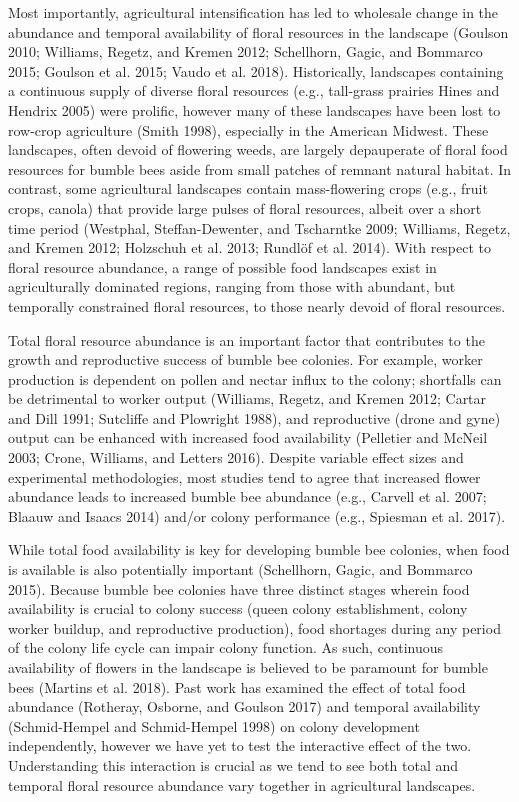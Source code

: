 \documentclass[11pt,]{article}
\begin{document}
Most importantly, agricultural intensification has led to wholesale
change in the abundance and temporal availability of floral resources in
the landscape (Goulson 2010; Williams, Regetz, and Kremen 2012;
Schellhorn, Gagic, and Bommarco 2015; Goulson et al. 2015; Vaudo et al.
2018). Historically, landscapes containing a continuous supply of
diverse floral resources (e.g., tall-grass prairies Hines and Hendrix
2005) were prolific, however many of these landscapes have been lost to
row-crop agriculture (Smith 1998), especially in the American Midwest.
These landscapes, often devoid of flowering weeds, are largely
depauperate of floral food resources for bumble bees aside from small
patches of remnant natural habitat. In contrast, some agricultural
landscapes contain mass-flowering crops (e.g., fruit crops, canola) that
provide large pulses of floral resources, albeit over a short time
period (Westphal, Steffan-Dewenter, and Tscharntke 2009; Williams,
Regetz, and Kremen 2012; Holzschuh et al. 2013; Rundlöf et al. 2014).
With respect to floral resource abundance, a range of possible food
landscapes exist in agriculturally dominated regions, ranging from those
with abundant, but temporally constrained floral resources, to those
nearly devoid of floral resources.

Total floral resource abundance is an important factor that contributes
to the growth and reproductive success of bumble bee colonies. For
example, worker production is dependent on pollen and nectar influx to
the colony; shortfalls can be detrimental to worker output (Williams,
Regetz, and Kremen 2012; Cartar and Dill 1991; Sutcliffe and Plowright
1988), and reproductive (drone and gyne) output can be enhanced with
increased food availability (Pelletier and McNeil 2003; Crone, Williams,
and Letters 2016). Despite variable effect sizes and experimental
methodologies, most studies tend to agree that increased flower
abundance leads to increased bumble bee abundance (e.g., Carvell et al.
2007; Blaauw and Isaacs 2014) and/or colony performance (e.g., Spiesman
et al. 2017).

While total food availability is key for developing bumble bee colonies,
when food is available is also potentially important (Schellhorn, Gagic,
and Bommarco 2015). Because bumble bee colonies have three distinct
stages wherein food availability is crucial to colony success (queen
colony establishment, colony worker buildup, and reproductive
production), food shortages during any period of the colony life cycle
can impair colony function. As such, continuous availability of flowers
in the landscape is believed to be paramount for bumble bees (Martins et
al. 2018). Past work has examined the effect of total food abundance
(Rotheray, Osborne, and Goulson 2017) and temporal availability
(Schmid-Hempel and Schmid-Hempel 1998) on colony development
independently, however we have yet to test the interactive effect of the
two. Understanding this interaction is crucial as we tend to see both
total and temporal floral resource abundance vary together in
agricultural landscapes.
\end{document}
